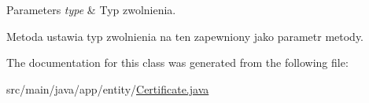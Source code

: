 \begin{DoxyParams}{Parameters}
{\em type} & Typ zwolnienia.\\
\hline
\end{DoxyParams}
Metoda ustawia typ zwolnienia na ten zapewniony jako parametr metody. 

The documentation for this class was generated from the following file\+:\begin{DoxyCompactItemize}
\item 
src/main/java/app/entity/\mbox{\hyperlink{_certificate_8java}{Certificate.\+java}}\end{DoxyCompactItemize}
